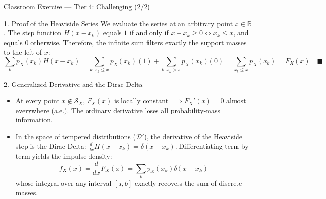 \documentclass[aspectratio=169,xcolor={dvipsnames,table}]{beamer}
\begin{document}
\begin{frame}{Classroom Exercise --- Tier 4: Challenging (2/2)}
	\fontsize{6.5pt}{7.8pt}\selectfont
	\begin{block}{1. Proof of the Heaviside Series}
		\fontsize{6.5pt}{7.8pt}\selectfont
		We evaluate the series at an arbitrary point $x \in \mathbb{R}$. The step function $H(x-x_k)$ equals $1$ if and only if $x - x_k \ge 0 \iff x_k \le x$, and equals $0$ otherwise. Therefore, the infinite sum filters exactly the support masses to the left of $x$:
		$$\sum_{k} p_X(x_k) H(x - x_k) = \sum_{k: x_k \le x} p_X(x_k)(1) + \sum_{k: x_k > x} p_X(x_k)(0) = \sum_{x_k \le x} p_X(x_k) = F_X(x) \quad \blacksquare$$
	\end{block}
	\vspace{-0.15cm}
	\pause
	\begin{alertblock}{2. Generalized Derivative and the Dirac Delta}
		\fontsize{6.5pt}{7.8pt}\selectfont
		\begin{itemize}\itemsep=0.06cm
			\item At every point $x \notin \mathcal{S}_X$, $F_X(x)$ is locally constant $\implies F_X'(x) = 0$ almost everywhere (a.e.). The ordinary derivative loses all probability-mass information.
			\item In the space of tempered distributions ($\mathcal{D}'$), the derivative of the Heaviside step is the Dirac Delta: $\frac{d}{dx}H(x-x_k) = \delta(x-x_k)$. Differentiating term by term yields the impulse density:
			$$f_X(x) = \frac{d}{dx}F_X(x) = \sum_{k} p_X(x_k) \delta(x - x_k)$$
			whose integral over any interval $[a,b]$ exactly recovers the sum of discrete masses.
		\end{itemize}
	\end{alertblock}
\end{frame}
\end{document}
